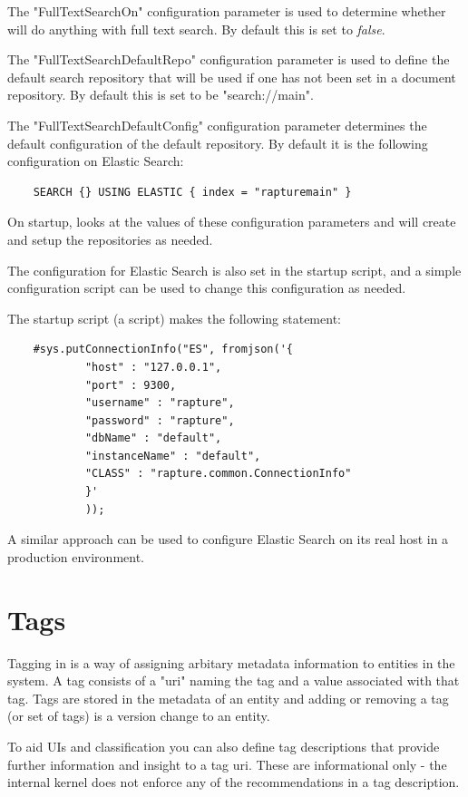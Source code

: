 The "FullTextSearchOn" configuration parameter is used to determine whether \Rapture will do anything with full text search. By default this
is set to \emph{false}.

The "FullTextSearchDefaultRepo" configuration parameter is used to define the default search repository that will be used
if one has not been set in a document repository. By default this is set to be "search://main".

The "FullTextSearchDefaultConfig" configuration parameter determines the default configuration of the default repository. By default it
is the following configuration on Elastic Search:

\begin{Verbatim}
	SEARCH {} USING ELASTIC { index = "rapturemain" }
\end{Verbatim}

On startup, \Rapture looks at the values of these configuration parameters and will create and setup the repositories
as needed.

The configuration for Elastic Search is also set in the startup script, and a simple \Reflex configuration script can be
used to change this configuration as needed.

The startup script (a \Reflex script) makes the following statement:

\begin{lstlisting}
	#sys.putConnectionInfo("ES", fromjson('{
			"host" : "127.0.0.1",
			"port" : 9300,
			"username" : "rapture",
			"password" : "rapture",
			"dbName" : "default",
			"instanceName" : "default",
			"CLASS" : "rapture.common.ConnectionInfo"
			}'
			));
\end{lstlisting}

A similar approach can be used to configure Elastic Search on its real host in a production environment.

\section{Tags}
Tagging in \Rapture is a way of assigning arbitary metadata information to entities in the system. A tag consists of a
"uri" naming the tag and a value associated with that tag. Tags are stored in the metadata of an entity and adding or
removing a tag (or set of tags) is a version change to an entity.

To aid UIs and classification you can also define tag descriptions that provide further information and insight to a tag uri. These
are informational only - the internal \Rapture kernel does not enforce any of the recommendations in a tag description.

